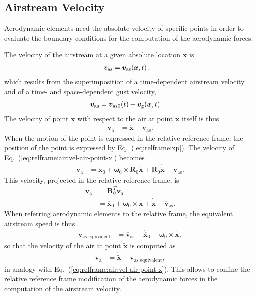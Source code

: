 \documentclass[10pt,fleqn,subeqn]{report}
\newcommand{\T}[1]{\bm{#1}}
\newcommand{\TT}[1]{\bm{#1}}
\begin{document}
\subsection{Airstream Velocity}
\label{sec:nodes:structural nodes:airstream velocity}
Aerodynamic elements need the absolute velocity of specific points
in order to evaluate the boundary conditions for the computation
of the aerodynamic forces.

The velocity of the airstream at a given absolute location $\T{x}$ is
\begin{align}
	\T{v}_{\text{as}}
	&= \T{v}_{\text{as}}\!\plbr{\T{x}, t} ,
\end{align}
which results from the superimposition of a time-dependent airstream velocity
and of a time- and space-dependent gust velocity,
\begin{align}
	\T{v}_{\text{as}}
	&= \T{v}_{\text{as0}}\!\plbr{t}
	+ \T{v}_{\text{g}}\!\plbr{\T{x}, t} .
\end{align}
The velocity of point $\T{x}$ with respect to the air at point $\T{x}$
itself is thus
\begin{align}
	\T{v}_{\text{a}}
	&= \dot{\T{x}}
	- \T{v}_{\text{as}} .
	\label{eq:relframe:air:vel-air-point-x}
\end{align}
When the motion of the point is expressed in the relative reference frame,
the position of the point is expressed by Eq.~(\ref{eq:relframe:xp}).
The velocity of Eq.~(\ref{eq:relframe:air:vel-air-point-x}) becomes
\begin{align}
	\T{v}_{\text{a}}
	&= \dot{\T{x}}_0
	+ \T{\omega}_0 \times \TT{R}_0 \tilde{\T{x}}
	+ \TT{R}_0 \dot{\tilde{\T{x}}}
	- \T{v}_{\text{as}} .
\end{align}
This velocity, projected in the relative reference frame, is
\begin{align}
	\overline{\T{v}}_{\text{a}}
	&= \TT{R}_0^T \T{v}_{\text{a}} \nonumber \\
	&= \dot{\overline{\T{x}}}_0
	+ \overline{\T{\omega}}_0 \times \tilde{\T{x}}
	+ \dot{\tilde{\T{x}}}
	- \overline{\T{v}}_{\text{as}} .
\end{align}
When referring aerodynamic elements to the relative frame,
the equivalent airstream speed is thus
\begin{align}
	\T{v}_{\text{as equivalent}}
	&=
	\overline{\T{v}}_{\text{as}}
	- \dot{\overline{\T{x}}}_0
	- \overline{\T{\omega}}_0 \times \tilde{\T{x}} ,
\end{align}
so that the velocity of the air at point $\tilde{\T{x}}$ is computed as
\begin{align}
	\overline{\T{v}}_{\text{a}}
	&= \dot{\tilde{\T{x}}}
	- \T{v}_{\text{as equivalent}} ,
\end{align}
in analogy with Eq.~(\ref{eq:relframe:air:vel-air-point-x}).
This allows to confine the relative reference frame modification
of the aerodynamic forces in the computation of the airstream velocity.
\end{document}
